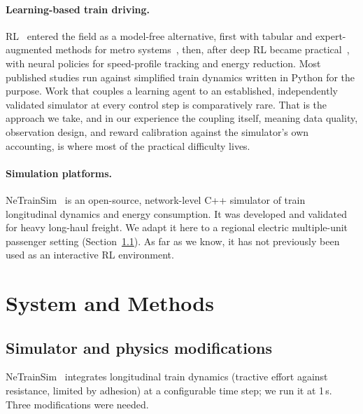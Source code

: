 \documentclass[11pt,a4paper]{article}
\begin{document}
\paragraph{Learning-based train driving.} RL~\cite{suttonbarto2018} entered
the field as a model-free alternative, first with tabular and
expert-augmented methods for metro systems~\cite{yin2014}, then, after deep
RL became practical~\cite{mnih2015}, with neural policies for speed-profile
tracking and energy reduction. Most published studies run against
simplified train dynamics written in Python for the purpose. Work that
couples a learning agent to an established, independently validated
simulator at every control step is comparatively rare. That is the
approach we take, and in our experience the coupling itself, meaning data
quality, observation design, and reward calibration against the
simulator's own accounting, is where most of the practical difficulty
lives.

\paragraph{Simulation platforms.} NeTrainSim~\cite{aredah2024} is an
open-source, network-level C++ simulator of train longitudinal dynamics
and energy consumption. It was developed and validated for heavy
long-haul freight. We adapt it here to a regional electric multiple-unit
passenger setting (Section~\ref{sec:simulator}). As far as we know, it
has not previously been used as an interactive RL environment.

\section{System and Methods}
\label{sec:methods}

\subsection{Simulator and physics modifications}
\label{sec:simulator}

NeTrainSim~\cite{aredah2024} integrates longitudinal train dynamics
(tractive effort against resistance, limited by adhesion) at a
configurable time step; we run it at 1\,s. Three modifications were
needed.
\end{document}
